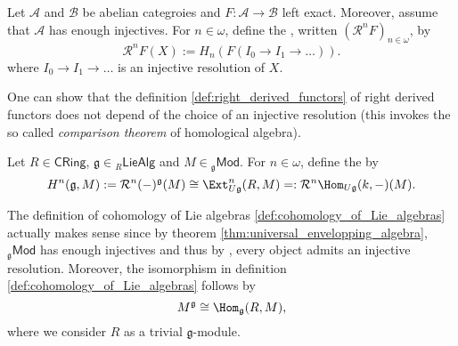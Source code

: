 \begin{definition}
	\label{def:right_derived_functors}
	Let $\mathcal{A}$ and $\mathcal{B}$ be abelian categroies and $F : \mathcal{A} \to \mathcal{B}$ left exact. Moreover, assume that $\mathcal{A}$ has enough injectives. For $n \in \omega$, define the , written $(\mathcal{R}^nF)_{n \in \omega}$, by
	\begin{equation*}
		\mathcal{R}^nF(X) := H_n(F(I_0 \to I_1 \to \dots)).
	\end{equation*}
	\noindent where $I_0 \to I_1 \to \dots$ is an injective resolution of $X$.
\end{definition}

\begin{remark}
	One can show that the definition \ref{def:right_derived_functors} of right derived functors does not depend of the choice of an injective resolution (this invokes the so called \emph{comparison theorem} of homological algebra).
\end{remark}

\begin{definition}
	\label{def:cohomology_of_Lie_algebras}
	Let $R \in \mathsf{CRing}$, $\mathfrak{g} \in {_{R}\mathsf{LieAlg}}$ and $M \in {_{\mathfrak{g}}}\mathsf{Mod}$. For $n \in \omega$, define the  by
	\begin{equation*}
		H^n(\mathfrak{g},M) := \mathcal{R}^n(-)^\mathfrak{g}(M) \cong \Ext^n_{U\mathfrak{g}}(R,M) =: \mathcal{R}^n\Hom_{U\mathfrak{g}}(k,-)(M).
	\end{equation*}
\end{definition}

\begin{remark}
	The definition of cohomology of Lie algebras \ref{def:cohomology_of_Lie_algebras} actually makes sense since by theorem \ref{thm:universal_envelopping_algebra}, $_{\mathfrak{g}}\mathsf{Mod}$ has enough injectives and thus by \cite[40]{weibel:homological_algebra:1994}, every object admits an injective resolution. Moreover, the isomorphism in definition \ref{def:cohomology_of_Lie_algebras} follows by
	\begin{equation*}
		M^\mathfrak{g} \cong \Hom_{\mathfrak{g}}(R,M),
	\end{equation*}
	\noindent where we consider $R$ as a trivial $\mathfrak{g}$-module.
\end{remark}

